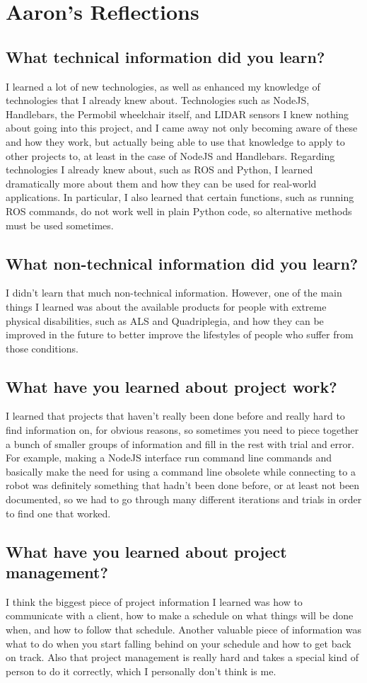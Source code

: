 \documentclass[onecolumn, draftclsnofoot,10pt, compsoc]{report}
\begin{document}
\section{Aaron's Reflections}
\subsection{What technical information did you learn?}
I learned a lot of new technologies, as well as enhanced my knowledge of technologies that I already knew about. Technologies such as NodeJS, Handlebars, the Permobil wheelchair itself, and LIDAR sensors I knew nothing about going into this project, and I came away not only becoming aware of these and how they work, but actually being able to use that knowledge to apply to other projects to, at least in the case of NodeJS and Handlebars. Regarding technologies I already knew about, such as ROS and Python, I learned dramatically more about them and how they can be used for real-world applications. In particular, I also learned that certain functions, such as running ROS commands, do not work well in plain Python code, so alternative methods must be used sometimes.
\subsection{What non-technical information did you learn?}
I didn't learn that much non-technical information. However, one of the main things I learned was about the available products for people with extreme physical disabilities, such as ALS and Quadriplegia, and how they can be improved in the future to better improve the lifestyles of people who suffer from those conditions.
\subsection{What have you learned about project work?}
I learned that projects that haven't really been done before and really hard to find information on, for obvious reasons, so sometimes you need to piece together a bunch of smaller groups of information and fill in the rest with trial and error. For example, making a NodeJS interface run command line commands and basically make the need for using a command line obsolete while connecting to a robot was definitely something that hadn't been done before, or at least not been documented, so we had to go through many different iterations and trials in order to find one that worked.
\subsection{What have you learned about project management?}
I think the biggest piece of project information I learned was how to communicate with a client, how to make a schedule on what things will be done when, and how to follow that schedule. Another valuable piece of information was what to do when you start falling behind on your schedule and how to get back on track. Also that project management is really hard and takes a special kind of person to do it correctly, which I personally don't think is me.
\end{document}

